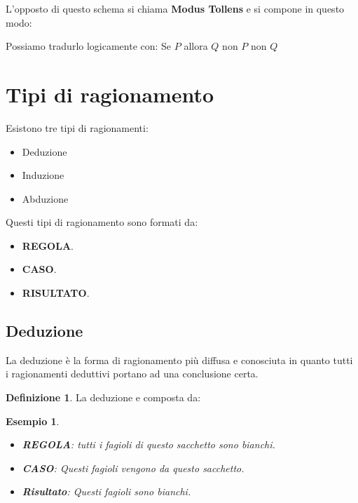 \documentclass{article}
\newtheorem{exmp}{Esempio}[section]
\theoremstyle{definition}
\newtheorem{definition}{Definizione}[section]
\begin{document}
L'opposto di questo schema si chiama \textbf{Modus Tollens} e si compone in questo modo:
\begin{tcolorbox}
        Possiamo tradurlo logicamente con: \newline
        Se $ P $ allora $ Q $ \newline
        non $ P $ \newline
        non $ Q $ \newline 
\end{tcolorbox}






\newpage
\section{Tipi di ragionamento}
Esistono tre tipi di ragionamenti:
\begin{itemize}
        \item Deduzione
        \item Induzione
        \item Abduzione
\end{itemize}

Questi tipi di ragionamento sono formati da:
\begin{itemize}
\item \textbf{REGOLA}.
\item \textbf{CASO}.
\item \textbf{RISULTATO}.
\end{itemize}



\subsection{Deduzione}
La deduzione è la forma di ragionamento più diffusa e conosciuta in quanto  tutti i ragionamenti deduttivi portano ad una conclusione certa.
\begin{definition}
        La deduzione e composta da:
        \begin{exmp}
                \begin{itemize}
                        \item\textbf{REGOLA}: tutti i fagioli di questo sacchetto sono bianchi.
                        \item\textbf{CASO}: Questi fagioli vengono da questo sacchetto.
                        \item \textbf{Risultato}: Questi fagioli sono bianchi. 
                \end{itemize}
        \end{exmp}
\end{definition}
\end{document}
